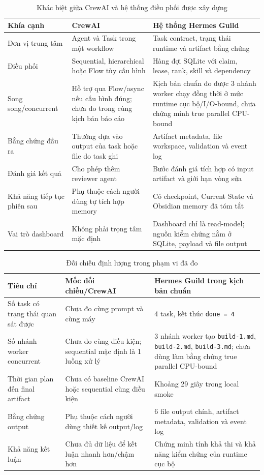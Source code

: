 \documentclass[12pt,a4paper]{article}
\begin{document}
\begin{table}[H]
\centering
\caption{Khác biệt giữa CrewAI và hệ thống điều phối được xây dựng}
\begin{tabular}{P{0.24\textwidth}P{0.32\textwidth}P{0.34\textwidth}}
\toprule
\textbf{Khía cạnh} & \textbf{CrewAI} & \textbf{Hệ thống Hermes Guild} \\
\midrule
Đơn vị trung tâm & Agent và Task trong một workflow & Task contract, trạng thái runtime và artifact bằng chứng \\
Điều phối & Sequential, hierarchical hoặc Flow tùy cấu hình & Hàng đợi SQLite với claim, lease, rank, skill và dependency \\
Song song/concurrent & Hỗ trợ qua Flow/async nếu cấu hình đúng; chưa đo trong cùng kịch bản báo cáo & Kịch bản chuẩn đo được 3 nhánh worker chạy đồng thời ở mức runtime cục bộ/I/O-bound, chưa chứng minh true parallel CPU-bound \\
Bằng chứng đầu ra & Thường dựa vào output của task hoặc file do task ghi & Artifact metadata, file workspace, validation và event log \\
Đánh giá kết quả & Cho phép thêm reviewer agent & Bước đánh giá tích hợp có input artifact và giới hạn vòng sửa \\
Khả năng tiếp tục phiên sau & Phụ thuộc cách người dùng tự tích hợp memory & Có checkpoint, Current State và Obsidian memory đã tóm tắt \\
Vai trò dashboard & Không phải trọng tâm mặc định & Dashboard chỉ là read-model; nguồn kiểm chứng nằm ở SQLite, payload và file output \\
\bottomrule
\end{tabular}
\end{table}

\begin{table}[H]
\centering
\caption{Đối chiếu định lượng trong phạm vi đã đo}
\small
\begin{tabular}{P{0.30\textwidth}P{0.30\textwidth}P{0.30\textwidth}}
\toprule
\textbf{Tiêu chí} & \textbf{Mốc đối chiếu/CrewAI} & \textbf{Hermes Guild trong kịch bản chuẩn} \\
\midrule
Số task có trạng thái quan sát được & Chưa đo cùng prompt và cùng máy & 4 task, kết thúc \texttt{done = 4} \\
Số nhánh worker concurrent & Chưa đo cùng điều kiện; sequential mặc định là 1 luồng xử lý & 3 nhánh worker tạo \texttt{build-1.md}, \texttt{build-2.md}, \texttt{build-3.md}; chưa dùng làm bằng chứng true parallel CPU-bound \\
Thời gian plan đến final artifact & Chưa có baseline CrewAI hoặc sequential cùng điều kiện & Khoảng 29 giây trong local smoke \\
Bằng chứng output & Phụ thuộc cách người dùng thiết kế output/log & 6 file output chính, artifact metadata, validation và event log \\
Khả năng kết luận & Chưa đủ dữ liệu để kết luận nhanh hơn/chậm hơn & Chứng minh tính khả thi và khả năng kiểm chứng của runtime cục bộ \\
\bottomrule
\end{tabular}
\end{table}
\end{document}
